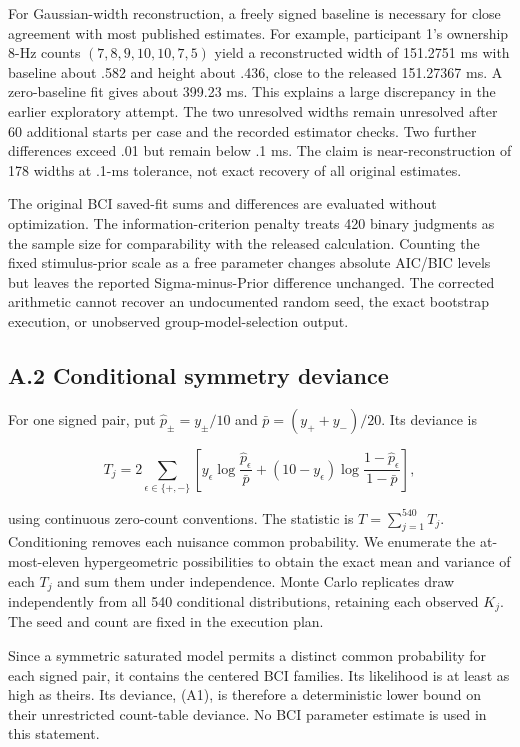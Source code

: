 \documentclass[
  11pt,
]{article}
\let\ctdoldsubsection\subsection
\renewcommand{\subsection}{\Needspace{6\baselineskip}\ctdoldsubsection}
\begin{document}
For Gaussian-width reconstruction, a freely signed baseline is necessary
for close agreement with most published estimates. For example,
participant 1's ownership 8-Hz counts \((7,8,9,10,10,7,5)\) yield a
reconstructed width of 151.2751 ms with baseline about .582 and height
about .436, close to the released 151.27367 ms. A zero-baseline fit
gives about 399.23 ms. This explains a large discrepancy in the earlier
exploratory attempt. The two unresolved widths remain unresolved after
60 additional starts per case and the recorded estimator checks. Two
further differences exceed .01 but remain below .1 ms. The claim is
near-reconstruction of 178 widths at .1-ms tolerance, not exact recovery
of all original estimates.

The original BCI saved-fit sums and differences are evaluated without
optimization. The information-criterion penalty treats 420 binary
judgments as the sample size for comparability with the released
calculation. Counting the fixed stimulus-prior scale as a free parameter
changes absolute AIC/BIC levels but leaves the reported
Sigma-minus-Prior difference unchanged. The corrected arithmetic cannot
recover an undocumented random seed, the exact bootstrap execution, or
unobserved group-model-selection output.

\hypertarget{a.2-conditional-symmetry-deviance}{%
\subsection{A.2 Conditional symmetry
deviance}\label{a.2-conditional-symmetry-deviance}}

For one signed pair, put \(\widehat p_\pm=y_\pm/10\) and
\(\bar p=(y_++y_-)/20\). Its deviance is

\[
T_j=2\sum_{\epsilon\in\{+,-\}}
\left[
y_\epsilon\log\frac{\widehat p_\epsilon}{\bar p}
+(10-y_\epsilon)\log\frac{1-\widehat p_\epsilon}{1-\bar p}
\right],
\tag{A1}
\]

using continuous zero-count conventions. The statistic is
\(T=\sum_{j=1}^{540}T_j\). Conditioning removes each nuisance common
probability. We enumerate the at-most-eleven hypergeometric
possibilities to obtain the exact mean and variance of each \(T_j\) and
sum them under independence. Monte Carlo replicates draw independently
from all 540 conditional distributions, retaining each observed \(K_j\).
The seed and count are fixed in the execution plan.

Since a symmetric saturated model permits a distinct common probability
for each signed pair, it contains the centered BCI families. Its
likelihood is at least as high as theirs. Its deviance, (A1), is
therefore a deterministic lower bound on their unrestricted count-table
deviance. No BCI parameter estimate is used in this statement.
\end{document}
